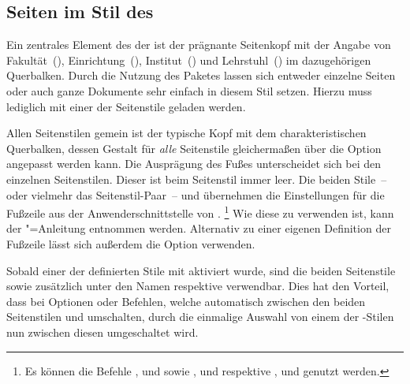 \subsection{Seiten im Stil des \CDs}
\begin{Declaration}[v2.02]{}
\begin{Declaration}[v2.02]{}
\begin{Declaration}[v2.02]{}
\printdeclarationlist%
\label{sec:tudheadings}
%
%
Ein zentrales Element des \CDs der \TnUD ist der prägnante Seitenkopf mit der 
Angabe von Fakultät~(), Einrichtung~(), 
Institut~() und Lehrstuhl~() im dazugehörigen 
Querbalken. Durch die Nutzung des Paketes  lassen 
sich entweder einzelne Seiten oder auch ganze Dokumente sehr einfach in diesem 
Stil setzen. Hierzu muss lediglich mit  
einer der Seitenstile geladen werden. 

Allen Seitenstilen gemein ist der typische Kopf mit dem charakteristischen 
Querbalken, dessen Gestalt für \emph{alle} Seitenstile gleichermaßen über die 
Option  angepasst werden kann. Die Ausprägung des Fußes 
unterscheidet sich bei den einzelnen Seitenstilen. Dieser ist beim Seitenstil 
 immer leer. Die beiden Stile~-- oder vielmehr das 
Seitenstil-Paar~--  und  
übernehmen die Einstellungen für die Fußzeile aus der Anwenderschnittstelle von 
.%
\footnote{%
  Es können die Befehle ,  und  sowie 
  ,  und  respektive , 
   und  genutzt werden.
}
Wie diese zu verwenden ist, kann der \KOMAScript"=Anleitung entnommen werden. 
Alternativ zu einer eigenen Definition der Fußzeile lässt sich außerdem die 
Option  verwenden.

Sobald einer der definierten Stile mit  
aktiviert wurde, sind die beiden Seitenstile  sowie 
 zusätzlich unter den Namen  
respektive  verwendbar. Dies hat den Vorteil, dass bei 
Optionen oder Befehlen, welche automatisch zwischen den beiden Seitenstilen 
 und  umschalten, durch die einmalige 
Auswahl von einem der -Stilen nun zwischen diesen  
umgeschaltet wird.


\end{Declaration}
\end{Declaration}
\end{Declaration}
